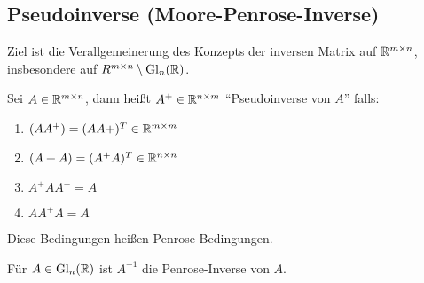 \subsection{Pseudoinverse (Moore-Penrose-Inverse)}
Ziel ist die Verallgemeinerung des Konzepts der inversen Matrix auf $\mathbb R^{m \times n}$,
insbesondere auf $R^{m \times n} \setminus \mathrm{Gl}_n(\mathbb R)$.
\begin{Definition}
Sei $A \in \mathbb R^{m \times n}$, dann heißt $A^+ \in \mathbb R^{n \times m}$ "`Pseudoinverse von $A$"'
falls:
 \begin{enumerate}
   \item $(A A^+) = (A A+)^T \in \mathbb R^{m \times m}$
   \item $(A+ A) = (A^+ A)^T \in \mathbb R^{n \times n}$
   \item $A^+ A A^+ = A$
   \item $A A^+ A = A$
 \end{enumerate}
Diese Bedingungen heißen Penrose Bedingungen.
\end{Definition}

\begin{Bemerkung}
  Für $A \in \mathrm{Gl}_n(\mathbb R)$ ist $A^{-1}$ die Penrose-Inverse von $A$.
\end{Bemerkung}

